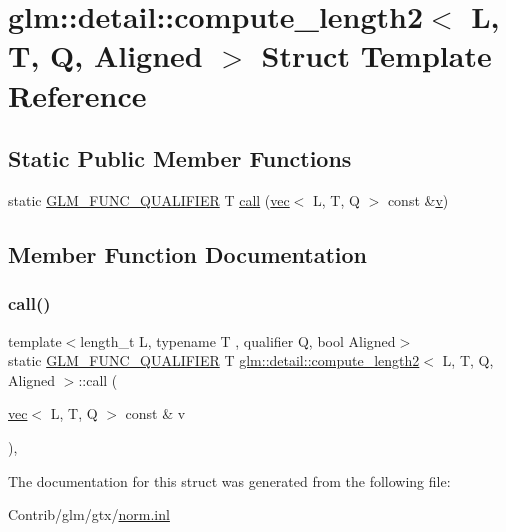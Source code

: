 \hypertarget{structglm_1_1detail_1_1compute__length2}{}\section{glm\+:\+:detail\+:\+:compute\+\_\+length2$<$ L, T, Q, Aligned $>$ Struct Template Reference}
\label{structglm_1_1detail_1_1compute__length2}
\subsection*{Static Public Member Functions}
\begin{DoxyCompactItemize}
\item 
static \mbox{\hyperlink{setup_8hpp_a33fdea6f91c5f834105f7415e2a64407}{G\+L\+M\+\_\+\+F\+U\+N\+C\+\_\+\+Q\+U\+A\+L\+I\+F\+I\+ER}} T \mbox{\hyperlink{structglm_1_1detail_1_1compute__length2_ac2b815d887a70ae91613c510a6adc07d}{call}} (\mbox{\hyperlink{structglm_1_1vec}{vec}}$<$ L, T, Q $>$ const \&\mbox{\hyperlink{_s_d_l__opengl_8h_a10a82eabcb59d2fcd74acee063775f90}{v}})
\end{DoxyCompactItemize}


\subsection{Member Function Documentation}
\mbox{\label{structglm_1_1detail_1_1compute__length2_ac2b815d887a70ae91613c510a6adc07d}} 
\subsubsection{\texorpdfstring{call()}{call()}}
{\footnotesize\ttfamily template$<$length\+\_\+t L, typename T , qualifier Q, bool Aligned$>$ \\
static \mbox{\hyperlink{setup_8hpp_a33fdea6f91c5f834105f7415e2a64407}{G\+L\+M\+\_\+\+F\+U\+N\+C\+\_\+\+Q\+U\+A\+L\+I\+F\+I\+ER}} T \mbox{\hyperlink{structglm_1_1detail_1_1compute__length2}{glm\+::detail\+::compute\+\_\+length2}}$<$ L, T, Q, Aligned $>$\+::call (\begin{DoxyParamCaption}\item[{\mbox{\hyperlink{structglm_1_1vec}{vec}}$<$ L, T, Q $>$ const \&}]{v }\end{DoxyParamCaption})\hspace{0.3cm}{\ttfamily [inline]}, {\ttfamily [static]}}



The documentation for this struct was generated from the following file\+:\begin{DoxyCompactItemize}
\item 
Contrib/glm/gtx/\mbox{\hyperlink{norm_8inl}{norm.\+inl}}\end{DoxyCompactItemize}

